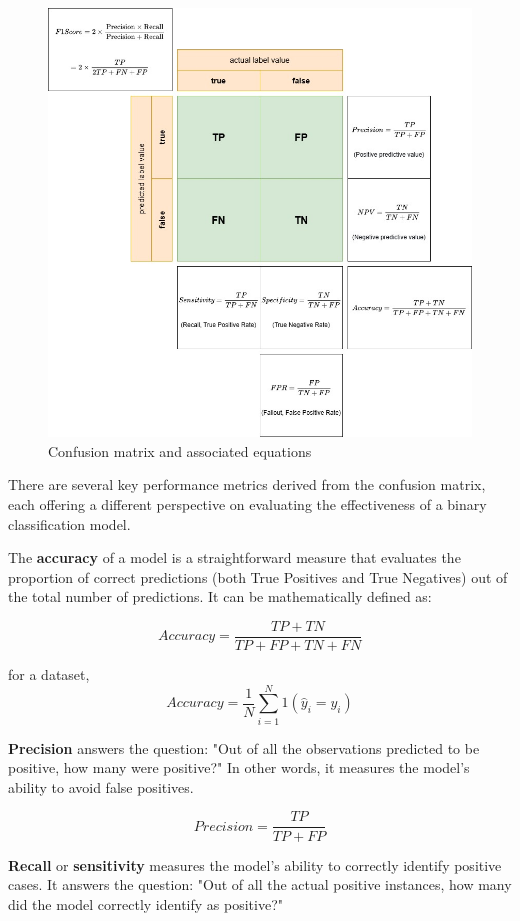 \documentclass[conference]{IEEEtran}
\begin{document}
	\begin{figure}[H]
		\centering
		\includegraphics[width=0.9\linewidth]{img/confusion_matrix}
		\caption{Confusion matrix and associated equations}
		\label{fig:confusionmatrix}
	\end{figure}
		
	
	There are several key performance metrics derived from the confusion matrix, each offering a different perspective on evaluating the effectiveness of a binary classification model.
	
	\bigskip
	
	The \textbf{accuracy} of a model is a straightforward measure that evaluates the proportion of correct predictions (both True Positives and True Negatives) out of the total number of predictions. It can be mathematically defined as:
	
	
	$$Accuracy=\frac{TP+TN}{TP+FP+TN+FN}$$
	
	for a dataset,
	$$
	Accuracy = \frac{1}{N} \sum_{i=1}^{N} 1(\hat{y}_i = y_i)
	$$
	
	
	\textbf{Precision} answers the question: "Out of all the observations predicted to be positive, how many were positive?" In other words, it measures the model's ability to avoid false positives.
	
	$$Precision=\frac{TP}{TP+FP}$$
	
	
	\textbf{Recall} or \textbf{sensitivity} measures the model's ability to correctly identify positive cases. It answers the question: "Out of all the actual positive instances, how many did the model correctly identify as positive?"
	
\end{document}
